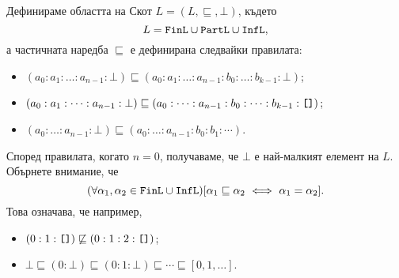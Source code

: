 Дефинираме областта на Скот $L = (L,\sqsubseteq, \bot)$, където
\[L = \texttt{FinL} \cup \texttt{PartL} \cup \texttt{InfL},\]
а частичната наредба $\sqsubseteq$ е дефинирана следвайки правилата:
\begin{itemize}
\item
  $(a_0 : a_1 : \dots: a_{n-1} : \bot) \sqsubseteq (a_0 : a_1 : \dots : a_{n-1} : b_0 : \dots : b_{k-1} : \bot)$;
\item
  $(a_0 : a_1 : \dots : a_{n-1} : \bot) \sqsubseteq (a_0 : \dots : a_{n-1} : b_0 : \dots : b_{k-1} : \texttt{[]})$;
\item
  $(a_0 : \dots : a_{n-1} : \bot) \sqsubseteq (a_0 : \dots : a_{n-1} : b_0 : b_1 : \cdots)$.
\end{itemize}


Според правилата, когато $n = 0$, получаваме, че $\bot$ е най-малкият елемент на $L$.
Обърнете внимание, че
\[(\forall \alpha_1,\alpha_2 \in \texttt{FinL} \cup \texttt{InfL})[\alpha_1 \sqsubseteq \alpha_2 \ \Longleftrightarrow\  \alpha_1 = \alpha_2].\]
Това означава, че например,
\begin{itemize}
\item
  $(0:1:\texttt{[]}) \not\sqsubseteq (0:1:2:\texttt{[]})$;
\item
  $\bot \sqsubseteq (0:\bot) \sqsubseteq (0:1:\bot) \sqsubseteq \cdots \sqsubseteq [0,1,\dots]$.
\end{itemize}

